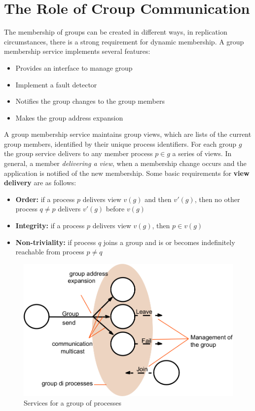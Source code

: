 \chapter{The Role of Croup Communication}
The membership of groups can be created in different ways, in replication circumstances, there is a strong requirement for dynamic membership. A group membership service implements several features:
\begin{itemize}
    \item Provides an interface to manage group
    \item Implement a fault detector
    \item Notifies the group changes to the group members
    \item Makes the group address expansion
\end{itemize}

A group membership service maintains group views, which are lists of the current group members, identified by their unique process identifiers. For each group \(g\) the group service delivers to any member process \(p \in g\) a series of views. In general, a member \textit{delivering a view}, when a membership change occurs and the application is notified of the new membership.
Some basic requirements for \textbf{view delivery} are as follows:
\begin{itemize}
    \item \textbf{Order:} if a process \(p\) delivers view \(v(g)\) and then \(v'(g)\), then no other process \(q  \neq p\) delivers \(v'(g)\) before \(v(g)\)
    \item \textbf{Integrity:} if a process \(p\) delivers view \(v(g)\), then \(p \in v(g)\)
    \item \textbf{Non-triviality:} if process \(q\) joins a group and is or becomes indefinitely reachable from process \(p \neq q\)
\end{itemize}

\begin{figure}[!h]
    \centering
    \includegraphics[width=.60\linewidth]{images/roleGroupCommunication/GroupOfProcesses.png}
    \caption{Services for a group of processes}
\end{figure}
\newpage

